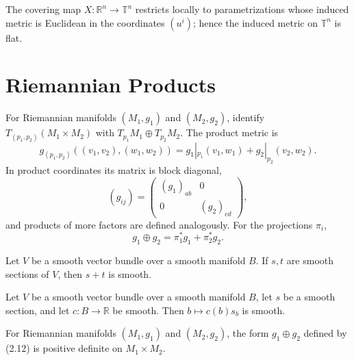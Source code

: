 \begin{example}
\label{ex:n-torus-riemannian-submanifold}

The covering map $X:\mathbb R^n\to\mathbb T^n$ restricts locally to parametrizations whose induced metric is Euclidean in the coordinates $(u^i)$; hence the induced metric on $\mathbb T^n$ is flat.
\end{example}

\section{Riemannian Products}

For Riemannian manifolds $(M_1,g_1)$ and $(M_2,g_2)$, identify
$T_{(p_1,p_2)}(M_1\times M_2)$ with
$T_{p_1}M_1\oplus T_{p_2}M_2$. The product metric is
\begin{equation}
g_{(p_1,p_2)}((v_1,v_2),(w_1,w_2))=g_1|_{p_1}(v_1,w_1)+g_2|_{p_2}(v_2,w_2). \tag{2.12}
\end{equation}
In product coordinates its matrix is block diagonal,
\[
(g_{ij})=\begin{pmatrix}(g_1)_{ab}&0\\0&(g_2)_{cd}\end{pmatrix},
\]
and products of more factors are defined analogously. For the projections $\pi_i$,
\begin{equation}
g_1\oplus g_2=\pi_1^*g_1+\pi_2^*g_2. \tag{2.12'}
\end{equation}

\begin{lemma}
\label{lem:smooth-tensor-field-add}



Let $V$ be a smooth vector bundle over a smooth manifold $B$. If $s,t$ are smooth sections of $V$, then $s+t$ is smooth.
\end{lemma}

\begin{lemma}
\label{lem:smooth-tensor-field-smul}



Let $V$ be a smooth vector bundle over a smooth manifold $B$, let $s$ be a smooth section, and let $c:B\to\mathbb R$ be smooth. Then $b\mapsto c(b)s_b$ is smooth.
\end{lemma}

\begin{lemma}
\label{lem:product-form-positive-definite}





For Riemannian manifolds $(M_1,g_1)$ and $(M_2,g_2)$, the form $g_1\oplus g_2$ defined by (2.12) is positive definite on $M_1\times M_2$.
\end{lemma}

